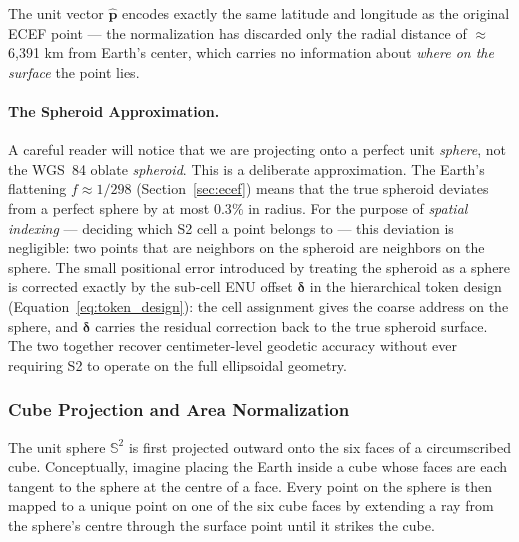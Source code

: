 \documentclass{book}
\begin{document}
The unit vector $\hat{\mathbf{p}}$ encodes exactly the same latitude
and longitude as the original ECEF point --- the normalization has
discarded only the radial distance of $\approx$6,391 km from Earth's
center, which carries no information about \emph{where on the surface}
the point lies.  
 
\paragraph{The Spheroid Approximation.}
 
A careful reader will notice that we are projecting onto a perfect
unit \emph{sphere}, not the WGS~84 oblate \emph{spheroid}.  This is a
deliberate approximation.  The Earth's flattening $f \approx 1/298$
(Section~\ref{sec:ecef}) means that the true spheroid deviates from a
perfect sphere by at most $0.3\%$ in radius.  For the purpose of
\emph{spatial indexing} --- deciding which S2 cell a point belongs to
--- this deviation is negligible: two points that are neighbors on the
spheroid are neighbors on the sphere.  The small positional error
introduced by treating the spheroid as a sphere is corrected exactly
by the sub-cell ENU offset $\boldsymbol{\delta}$ in the hierarchical
token design (Equation~\ref{eq:token_design}): the cell assignment
gives the coarse address on the sphere, and $\boldsymbol{\delta}$
carries the residual correction back to the true spheroid surface.
The two together recover centimeter-level geodetic accuracy without
ever requiring S2 to operate on the full ellipsoidal geometry.

\subsubsection{Cube Projection and Area Normalization}
 
The unit sphere $\mathbb{S}^2$ is first projected outward onto the six
faces of a circumscribed cube.  Conceptually, imagine placing the Earth
inside a cube whose faces are each tangent to the sphere at the centre
of a face.  Every point on the sphere is then mapped to a unique point
on one of the six cube faces by extending a ray from the sphere's centre
through the surface point until it strikes the cube.
 
\end{document}
